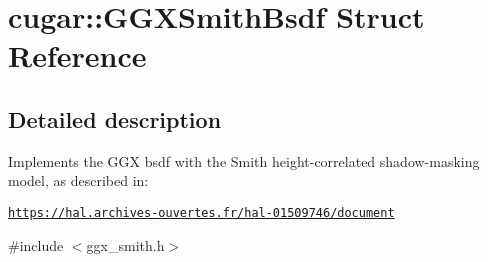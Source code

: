 \hypertarget{structcugar_1_1_g_g_x_smith_bsdf}{}\section{cugar\+:\+:G\+G\+X\+Smith\+Bsdf Struct Reference}
\label{structcugar_1_1_g_g_x_smith_bsdf}


\subsection{Detailed description}
Implements the G\+GX bsdf with the Smith height-\/correlated shadow-\/masking model, as described in\+:

\href{https://hal.archives-ouvertes.fr/hal-01509746/document}{\tt https\+://hal.\+archives-\/ouvertes.\+fr/hal-\/01509746/document} 

{\ttfamily \#include $<$ggx\+\_\+smith.\+h$>$}

